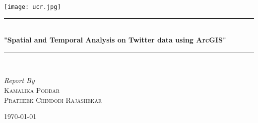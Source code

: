 \documentclass[12pt, oneside]{article}   	%
\begin{document}
\begin{titlepage}
	\begin{center}
	\vspace*{0.1cm}
	\texttt{[image: ucr.jpg]}
	\newcommand{\HRule}{\rule{\linewidth}{0.5mm}} 
	\centering
	\HRule \\[0.5cm]
	{ \Huge \bfseries "Spatial and Temporal Analysis on Twitter data using ArcGIS"}\\[0.4cm] %
	\HRule \\[1.5cm]
	
		\vspace{3cm}
	
		\emph{Report By}\\
		\vspace{1cm}
		\textsc{\LARGE Kamalika Poddar}\\ 
		\vspace{0.2cm}		
		\vspace{0.2cm}
		\textsc{\LARGE	Pratheek Chindodi Rajashekar} \\
			\bigskip
		
	
		\vspace*{4cm}
		\Large \today
	\end{center}	
	\vspace{1cm}
	\vfill 
\end{titlepage}

\setcounter{page}{1}
\pagestyle{fancy}

\newpage
\vspace{2cm}
\end{document}
